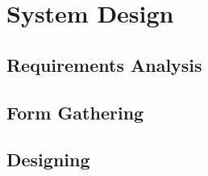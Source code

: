 \section{System Design}
\subsection{Requirements Analysis}

\subsection{Form Gathering}

\subsection{Designing}

